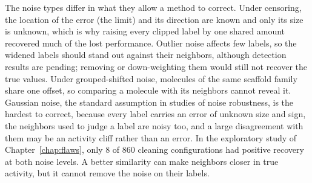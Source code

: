 The noise types differ in what they allow a method to correct. Under censoring, the location of the error (the limit) and its direction are known and only its size is unknown, which is why raising every clipped label by one shared amount recovered much of the lost performance. Outlier noise affects few labels, so the widened labels should stand out against their neighbors, although detection results are pending; removing or down-weighting them would still not recover the true values. Under grouped-shifted noise, molecules of the same scaffold family share one offset, so comparing a molecule with its neighbors cannot reveal it. Gaussian noise, the standard assumption in studies of noise robustness, is the hardest to correct, because every label carries an error of unknown size and sign, the neighbors used to judge a label are noisy too, and a large disagreement with them may be an activity cliff rather than an error. In the exploratory study of Chapter~\ref{chap:flaws}, only 8 of 860 cleaning configurations had positive recovery at both noise levels. A better similarity can make neighbors closer in true activity, but it cannot remove the noise on their labels.


